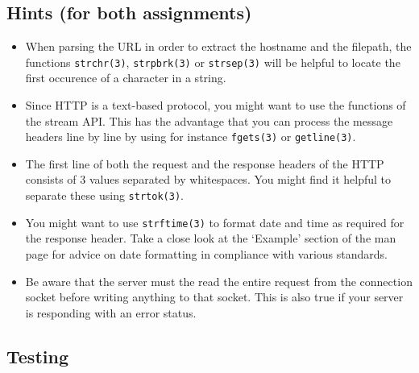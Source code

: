 \subsection*{Hints (for both assignments)}
\begin{itemize}
\item When parsing the URL
in order to extract the hostname and the filepath,
the functions \verb|strchr(3)|, \verb|strpbrk(3)| or \verb|strsep(3)|
will be helpful to locate the first occurence of a character in a string.

\item Since HTTP is a text-based protocol,
you might want to use the functions of the stream API.
This has the advantage that you can process the message headers line by line
by using for instance \verb|fgets(3)| or \verb|getline(3)|.

\item The first line of both the request and the response headers of the HTTP
consists of 3 values separated by whitespaces.
You might find it helpful to separate these using \verb|strtok(3)|.

\item You might want to use \verb|strftime(3)|
to format date and time as required for the response header.
Take a close look at the `Example' section of the man page
for advice on date formatting in compliance with various standards.

\item Be aware that the server must the read the entire request
from the connection socket before writing anything to that socket.
This is also true if your server is responding with an error status.

\end{itemize}

\clearpage
\subsection*{Testing}

